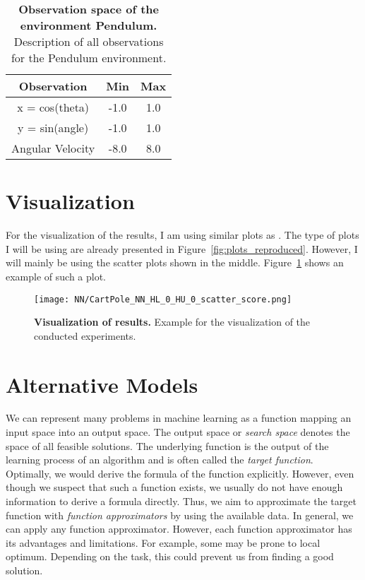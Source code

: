 \begin{table}[!ht]
  \centering
  \begin{tabular}{ |c|c|c| }
    \hline
    Observation & Min & Max \\
    \hline
    x = cos(theta) & -1.0 & 1.0 \\
    y = sin(angle) & -1.0 & 1.0 \\
    Angular Velocity & -8.0 & 8.0 \\
    \hline
  \end{tabular}
  \caption[Observation space of the environment Pendulum]{
    \textbf{Observation space of the environment Pendulum.}
    Description of all observations for the Pendulum environment.
  }
  \label{table:pendulum_obs}
\end{table}


\section{Visualization}
For the visualization of the results, I am using similar plots as \cite{oller_analyzing_2020}. The type of plots I will be using are already presented in Figure~\ref{fig:plots_reproduced}. However, I will mainly be using the scatter plots shown in the middle. Figure~\ref{fig:visualization} shows an example of such a plot.
\begin{figure}[!ht]
  \centering
\texttt{[image: NN/CartPole\_NN\_HL\_0\_HU\_0\_scatter\_score.png]}
\caption[Visualization of results]{
  \textbf{Visualization of results.}
  Example for the visualization of the conducted experiments.
}
\label{fig:visualization}
\end{figure}


\section{Alternative Models}
\label{sec:models}
We can represent many problems in machine learning as a function mapping an input space into an output space. The output space or \textit{search space} denotes the space of all feasible solutions. The underlying function is the output of the learning process of an algorithm and is often called the \textit{target function}. Optimally, we would derive the formula of the function explicitly. However, even though we suspect that such a function exists, we usually do not have enough information to derive a formula directly. Thus, we aim to approximate the target function with \textit{function approximators} by using the available data. In general, we can apply any function approximator. However, each function approximator has its advantages and limitations. For example, some may be prone to local optimum. Depending on the task, this could prevent us from finding a good solution.
